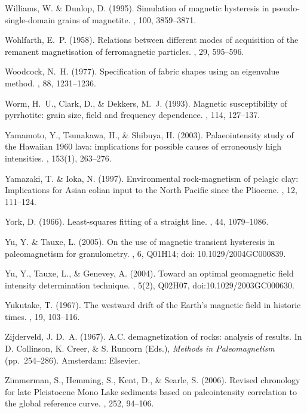 \documentclass[11pt]{book}
\begin{document}
\begin{thebibliography}{}
Williams, W. \& Dunlop, D. (1995).
\newblock Simulation of magnetic hysteresis in pseudo-single-domain grains of
  magnetite.
, 100, 3859--3871.

Wohlfarth, E.~P. (1958).
\newblock Relations between different modes of acquisition of the remanent
  magnetisation of ferromagnetic particles.
, 29, 595--596.

Woodcock, N.~H. (1977).
\newblock Specification of fabric shapes using an eigenvalue method.
, 88, 1231--1236.

Worm, H.~U., Clark, D., \& Dekkers, M.~J. (1993).
\newblock Magnetic susceptibility of pyrrhotite: grain size, field and
  frequency dependence.
, 114, 127--137.

Yamamoto, Y., Tsunakawa, H., \& Shibuya, H. (2003).
\newblock Palaeointensity study of the Hawaiian 1960 lava: implications for
  possible causes of erroneously high intensities.
, 153(1), 263--276.

Yamazaki, T. \& Ioka, N. (1997).
\newblock Environmental rock-magnetism of pelagic clay: Implications for Asian
  eolian input to the North Pacific since the Pliocene.
, 12, 111--124.

York, D. (1966).
\newblock Least-squares fitting of a straight line.
, 44, 1079--1086.

Yu, Y. \& Tauxe, L. (2005).
\newblock On the use of magnetic transient hysteresis in paleomagnetism for
  granulometry.
, 6, Q01H14; doi:
  10.1029/2004GC000839.

Yu, Y., Tauxe, L., \& Genevey, A. (2004).
\newblock Toward an optimal geomagnetic field intensity determination
  technique.
, 5(2), Q02H07,
  doi:10.1029/2003GC000630.

Yukutake, T. (1967).
\newblock The westward drift of the Earth's magnetic field in historic times.
, 19, 103--116.

Zijderveld, J. D.~A. (1967).
\newblock A.C. demagnetization of rocks: analysis of results.
\newblock In D. Collinson, K. Creer, \& S. Runcorn (Eds.), {\em Methods in
  Paleomagnetism}  (pp.\ 254--286). Amsterdam: Elsevier.

Zimmerman, S., Hemming, S., Kent, D., \& Searle, S. (2006).
\newblock Revised chronology for late Pleistocene Mono Lake sediments based on
  paleointensity correlation to the global reference curve.
, 252, 94--106.

\end{thebibliography}
\end{document}
